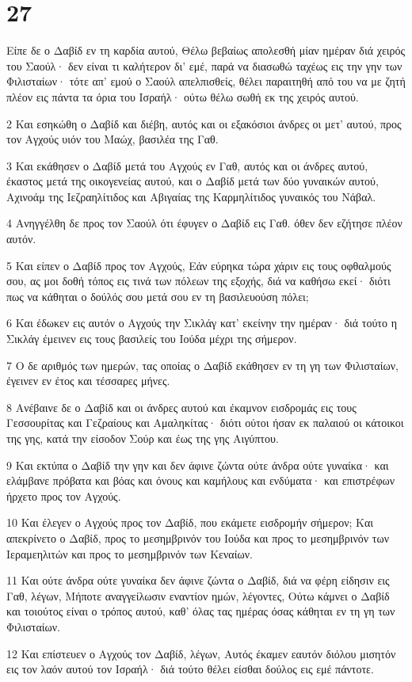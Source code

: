 \chapter{27}

\par Είπε δε ο Δαβίδ εν τη καρδία αυτού, Θέλω βεβαίως απολεσθή μίαν ημέραν διά χειρός του Σαούλ· δεν είναι τι καλήτερον δι' εμέ, παρά να διασωθώ ταχέως εις την γην των Φιλισταίων· τότε απ' εμού ο Σαούλ απελπισθείς, θέλει παραιτηθή από του να με ζητή πλέον εις πάντα τα όρια του Ισραήλ· ούτω θέλω σωθή εκ της χειρός αυτού.
\par 2 Και εσηκώθη ο Δαβίδ και διέβη, αυτός και οι εξακόσιοι άνδρες οι μετ' αυτού, προς τον Αγχούς υιόν του Μαώχ, βασιλέα της Γαθ.
\par 3 Και εκάθησεν ο Δαβίδ μετά του Αγχούς εν Γαθ, αυτός και οι άνδρες αυτού, έκαστος μετά της οικογενείας αυτού, και ο Δαβίδ μετά των δύο γυναικών αυτού, Αχινοάμ της Ιεζραηλίτιδος και Αβιγαίας της Καρμηλίτιδος γυναικός του Νάβαλ.
\par 4 Ανηγγέλθη δε προς τον Σαούλ ότι έφυγεν ο Δαβίδ εις Γαθ. όθεν δεν εζήτησε πλέον αυτόν.
\par 5 Και είπεν ο Δαβίδ προς τον Αγχούς, Εάν εύρηκα τώρα χάριν εις τους οφθαλμούς σου, ας μοι δοθή τόπος εις τινά των πόλεων της εξοχής, διά να καθήσω εκεί· διότι πως να κάθηται ο δούλός σου μετά σου εν τη βασιλευούση πόλει;
\par 6 Και έδωκεν εις αυτόν ο Αγχούς την Σικλάγ κατ' εκείνην την ημέραν· διά τούτο η Σικλάγ έμεινεν εις τους βασιλείς του Ιούδα μέχρι της σήμερον.
\par 7 Ο δε αριθμός των ημερών, τας οποίας ο Δαβίδ εκάθησεν εν τη γη των Φιλισταίων, έγεινεν εν έτος και τέσσαρες μήνες.
\par 8 Ανέβαινε δε ο Δαβίδ και οι άνδρες αυτού και έκαμνον εισδρομάς εις τους Γεσσουρίτας και Γεζραίους και Αμαληκίτας· διότι ούτοι ήσαν εκ παλαιού οι κάτοικοι της γης, κατά την είσοδον Σούρ και έως της γης Αιγύπτου.
\par 9 Και εκτύπα ο Δαβίδ την γην και δεν άφινε ζώντα ούτε άνδρα ούτε γυναίκα· και ελάμβανε πρόβατα και βόας και όνους και καμήλους και ενδύματα· και επιστρέφων ήρχετο προς τον Αγχούς.
\par 10 Και έλεγεν ο Αγχούς προς τον Δαβίδ, που εκάμετε εισδρομήν σήμερον; Και απεκρίνετο ο Δαβίδ, προς το μεσημβρινόν του Ιούδα και προς το μεσημβρινόν των Ιεραμεηλιτών και προς το μεσημβρινόν των Κεναίων.
\par 11 Και ούτε άνδρα ούτε γυναίκα δεν άφινε ζώντα ο Δαβίδ, διά να φέρη είδησιν εις Γαθ, λέγων, Μήποτε αναγγείλωσιν εναντίον ημών, λέγοντες, Ούτω κάμνει ο Δαβίδ και τοιούτος είναι ο τρόπος αυτού, καθ' όλας τας ημέρας όσας κάθηται εν τη γη των Φιλισταίων.
\par 12 Και επίστευεν ο Αγχούς τον Δαβίδ, λέγων, Αυτός έκαμεν εαυτόν διόλου μισητόν εις τον λαόν αυτού τον Ισραήλ· διά τούτο θέλει είσθαι δούλος εις εμέ πάντοτε.

